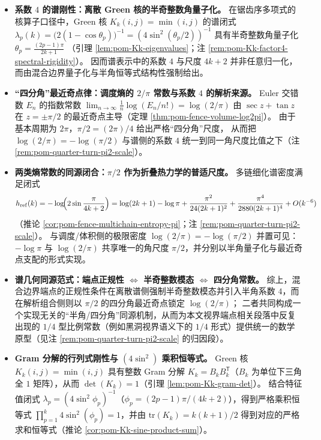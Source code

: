 \begin{enumerate}
\begin{itemize}
    \item \textbf{系数 \(4\) 的谱刚性：离散 Green 核的半奇整数角量子化。}
    在锯齿序多项式的核算子口径中，Green 核
    \(K_k(i,j)=\min(i,j)\) 的谱闭式
    \(
    \lambda_p(k)=\bigl(2(1-\cos\theta_p)\bigr)^{-1}=(4\sin^2(\theta_p/2))^{-1}
    \)
    具有半奇整数角量子化
    \(
    \theta_p=\frac{(2p-1)\pi}{2k+1}
    \)
    （引理 \ref{lem:pom-Kk-eigenvalues}；注 \ref{rem:pom-Kk-factor4-spectral-rigidity}）。
    因而谱表示中的系数 \(4\) 与尺度 \(4k+2\) 并非任意归一化，而由混合边界量子化与半角恒等式结构性强制给出。

    \item \textbf{“四分角”最近奇点律：调度熵的 \texorpdfstring{\(2/\pi\)}{2/pi} 常数与系数 \(4\) 的解析来源。}
    Euler 交错数 \(E_n\) 的指数常数
    \(
    \lim_{n\to\infty}\frac1n\log(E_n/n!)=\log(2/\pi)
    \)
    由 \(\sec z+\tan z\) 在 \(z=\pm\pi/2\) 的最近奇点主导（定理 \ref{thm:pom-fence-volume-log2pi}）。
    由于基本周期为 \(2\pi\)，\(\pi/2=(2\pi)/4\) 给出严格“四分角”尺度，
    从而把 \(\log(2/\pi)=-\log(\pi/2)\) 与谱侧的系数 \(4\) 统一到同一角尺度比值之下（注 \ref{rem:pom-quarter-turn-pi2-scale}）。

    \item \textbf{两类熵常数的同源闭合：\texorpdfstring{\(\pi/2\)}{pi/2} 作为折叠热力学的普适尺度。}
    多链细化谱密度满足闭式
    \[
    h_{\mathrm{ref}}(k)=-\log\!\Bigl(2\sin\frac{\pi}{4k+2}\Bigr)
    =\log(2k+1)-\log\pi+\frac{\pi^2}{24(2k+1)^2}+\frac{\pi^4}{2880(2k+1)^4}+O(k^{-6})
    \]
    （推论 \ref{cor:pom-fence-multichain-entropy-pi}；注 \ref{rem:pom-quarter-turn-pi2-scale}）。
    与调度/体积侧的极限密度 \(\log(2/\pi)=-\log(\pi/2)\) 并置可见：\(-\log\pi\) 与 \(\log(2/\pi)\) 共享唯一的角尺度 \(\pi/2\)，并分别以半角量子化与最近奇点支配的形式实现。

    \item \textbf{谱几何同源范式：端点正规性 \texorpdfstring{\(\Longleftrightarrow\)}{<->} 半奇整数模态 \texorpdfstring{\(\Longleftrightarrow\)}{<->} 四分角常数。}
    综上，混合边界端点的正规性条件在离散谱侧强制半奇整数模态并引入半角系数 \(4\)，而在解析组合侧则以 \(\pi/2\) 的四分角最近奇点锁定 \(\log(2/\pi)\)；
    二者共同构成一个实现无关的“半角/四分角”同源机制，从而为本文视界端点相关段落中反复出现的 \(1/4\) 型比例常数（例如黑洞视界语义下的 \(1/4\) 形式）提供统一的数学原型（见注 \ref{rem:pom-quarter-turn-pi2-scale} 的归因段）。

    \item \textbf{Gram 分解的行列式刚性与 \texorpdfstring{\((4\sin^2)\)}{(4 sin^2)} 乘积恒等式。}
    Green 核 \(K_k(i,j)=\min(i,j)\) 具有整数 Gram 分解 \(K_k=B_kB_k^{\mathsf T}\)（\(B_k\) 为单位下三角全 \(1\) 矩阵），从而 \(\det(K_k)=1\)（引理 \ref{lem:pom-Kk-gram-det}）。
    结合特征值闭式 \(\lambda_p=(4\sin^2\phi_p)^{-1}\)（\(\phi_p=(2p-1)\pi/(4k+2)\)），得到严格乘积恒等式
    \(
    \prod_{p=1}^{k}4\sin^2(\phi_p)=1
    \)，并由 \(\mathrm{tr}(K_k)=k(k+1)/2\) 得到对应的严格求和恒等式（推论 \ref{cor:pom-Kk-sine-product-sum}）。


\end{itemize}
\end{enumerate}
